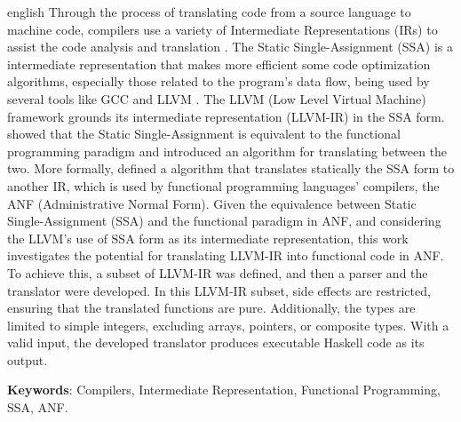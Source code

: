 
\begin{resumo}[Abstract]
 \begin{otherlanguage*}{english}
    Through the process of translating code from a source language to machine code, compilers use a variety of Intermediate Representations (IRs) to assist the code analysis and translation \cite{dragao}. The Static Single-Assignment (SSA) is a intermediate representation that makes more efficient some code optimization algorithms, especially those related to the program's data flow, being used by several tools like GCC and LLVM \cite{muchnick1997advanced}. The LLVM (Low Level Virtual Machine) framework grounds its intermediate representation (LLVM-IR) in the SSA form. \cite{appel1998ssa} showed that the Static Single-Assignment is equivalent to the functional programming paradigm and introduced an algorithm for translating between the two. More formally,  defined a algorithm that translates statically the SSA form to another IR, which is used by functional programming languages' compilers, the ANF (Administrative Normal Form). Given the equivalence between Static Single-Assignment (SSA) and the functional paradigm in ANF, and considering the LLVM's use of SSA form as its intermediate representation, this work investigates the potential for translating LLVM-IR into functional code in ANF. To achieve this, a subset of LLVM-IR was defined, and then a parser and the translator were developed. In this LLVM-IR subset, side effects are restricted, ensuring that the translated functions are pure. Additionally, the types are limited to simple integers, excluding arrays, pointers, or composite types. With a valid input, the developed translator produces executable Haskell code as its output.

   \textbf{Keywords}: Compilers, Intermediate Representation, Functional Programming, SSA, ANF.
 \end{otherlanguage*}
\end{resumo}

